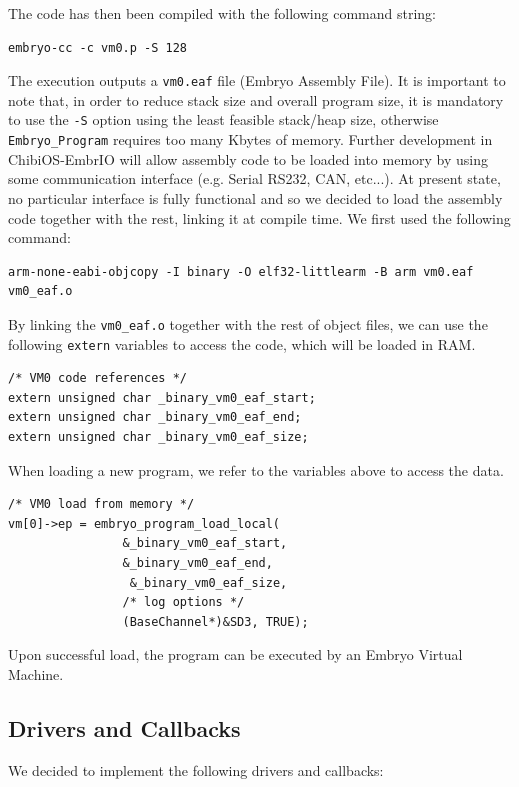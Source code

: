 \documentclass[a4paper,10pt]{article}
\begin{document}
\begin{multicols}{2}
The code has then been compiled with the following command string:
\medskip
\lstset{language=bash}
\begin{lstlisting}[caption={compile command}]
embryo-cc -c vm0.p -S 128
\end{lstlisting}
\medskip
The execution outputs a \texttt{vm0.eaf} file (Embryo Assembly File). It is important to note that, in order to reduce stack size and overall program size, it is mandatory to use the \texttt{-S} option using the least feasible stack/heap size, otherwise \texttt{Embryo\_Program} requires too many Kbytes of memory.
Further development in ChibiOS-EmbrIO will allow assembly code to be loaded into memory by using some communication interface (e.g. Serial RS232, CAN, etc...). At present state, no particular interface is fully functional and so we decided to load the assembly code together with the rest, linking it at compile time. We first used the following command:
\medskip
\lstset{language=bash}
\begin{lstlisting}[caption={object code command}]
arm-none-eabi-objcopy -I binary -O elf32-littlearm -B arm vm0.eaf vm0_eaf.o
\end{lstlisting}
\medskip
By linking the \texttt{vm0\_eaf.o} together with the rest of object files, we can use the following \texttt{extern} variables to access the code, which will be loaded in RAM.
\medskip
\lstset{language=C}
\begin{lstlisting}[caption={code location variables}]
/* VM0 code references */
extern unsigned char _binary_vm0_eaf_start;
extern unsigned char _binary_vm0_eaf_end;
extern unsigned char _binary_vm0_eaf_size;
\end{lstlisting}
\medskip
When loading a new program, we refer to the variables above to access the data.
\medskip
\lstset{language=C}
\begin{lstlisting}[caption={Program load}]
/* VM0 load from memory */
vm[0]->ep = embryo_program_load_local(
				&_binary_vm0_eaf_start,
				&_binary_vm0_eaf_end,
				 &_binary_vm0_eaf_size,
				/* log options */
				(BaseChannel*)&SD3, TRUE);
\end{lstlisting}
\medskip
Upon successful load, the program can be executed by an Embryo Virtual Machine.

\subsection{Drivers and Callbacks}
We decided to implement the following drivers and callbacks:


\end{multicols}
\end{document}
